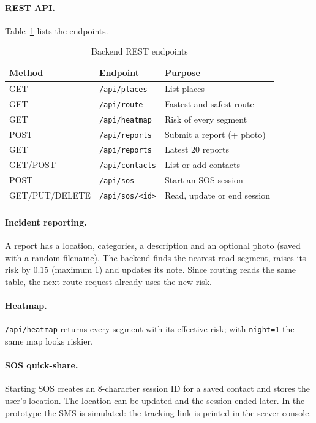 \documentclass{tietreport}
\begin{document}
\paragraph{REST API.} Table~\ref{tab:api} lists the endpoints.

\begin{table}[h]
\centering
\small
\begin{tabular}{|l|p{4.6cm}|p{5.6cm}|}
  \hline
  \textbf{Method} & \textbf{Endpoint} & \textbf{Purpose} \\ \hline
  GET  & \texttt{/api/places}  & List places \\ \hline
  GET  & \texttt{/api/route}   & Fastest and safest route \\ \hline
  GET  & \texttt{/api/heatmap} & Risk of every segment \\ \hline
  POST & \texttt{/api/reports} & Submit a report (+ photo) \\ \hline
  GET  & \texttt{/api/reports} & Latest 20 reports \\ \hline
  GET/POST & \texttt{/api/contacts} & List or add contacts \\ \hline
  POST & \texttt{/api/sos}     & Start an SOS session \\ \hline
  GET/PUT/DELETE & \texttt{/api/sos/<id>} & Read, update or end session \\ \hline
\end{tabular}
\caption{Backend REST endpoints}
\label{tab:api}
\end{table}

\paragraph{Incident reporting.} A report has a location, categories, a
description and an optional photo (saved with a random filename). The
backend finds the nearest road segment, raises its risk by $0.15$
(maximum $1$) and updates its note. Since routing reads the same table,
the next route request already uses the new risk.

\paragraph{Heatmap.} \texttt{/api/heatmap} returns every segment with
its effective risk; with \texttt{night=1} the same map looks riskier.

\paragraph{SOS quick-share.} Starting SOS creates an 8-character session
ID for a saved contact and stores the user's location. The location can
be updated and the session ended later. In the prototype the SMS is
simulated: the tracking link is printed in the server console.
\end{document}
